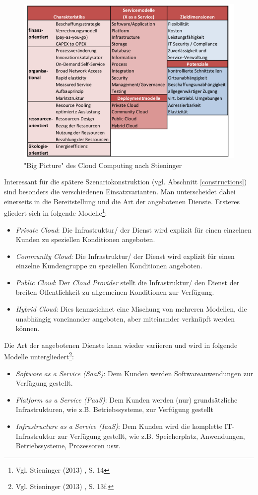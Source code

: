 \begin{figure}
	\centering
	\includegraphics[width=\linewidth]{images/bigpicture}
	\caption[Caption for parameters]{ "Big Picture" des Cloud Computing nach Stieninger \cite{stieninger}}
	\label{fig:bigpicture}
\end{figure}

Interessant für die spätere Szenariokonstruktion (vgl. Abschnitt \ref{constructions}) sind besonders die verschiedenen Einsatzvarianten. Man unterscheidet dabei einerseits in die Bereitstellung und die Art der angebotenen Dienste. Ersteres gliedert sich in folgende Modelle\footnote{Vgl. Stieninger (2013) \cite{stieninger}, S. 14}:
\begin{itemize}
	\item \textit{Private Cloud}: Die Infrastruktur/ der Dienst wird explizit für einen einzelnen Kunden zu speziellen Konditionen angeboten.
	\item \textit{Community Cloud}: Die Infrastruktur/ der Dienst wird explizit für einen einzelne Kundengruppe zu speziellen Konditionen angeboten.
	\item \textit{Public Cloud}: Der \textit{Cloud Provider} stellt die Infrastruktur/ den Dienst der breiten Öffentlichkeit zu allgemeinen Konditionen zur Verfügung.
	\item \textit{Hybrid Cloud}: Dies kennzeichnet eine Mischung von mehreren Modellen, die unabhängig voneinander angeboten, aber miteinander verknüpft werden können.
\end{itemize}

Die Art der angebotenen Dienste kann wieder variieren und wird in folgende Modelle untergliedert\footnote{Vgl. Stieninger (2013) \cite{stieninger}, S. 13f.}:
\begin{itemize}
	\item \textit{Software as a Service (SaaS)}: Dem Kunden werden Softwareanwendungen zur Verfügung gestellt.
	\item \textit{Platform as a Service (PaaS)}: Dem Kunden werden (nur) grundsätzliche Infrastrukturen, wie z.B. Betriebssysteme, zur Verfügung gestellt
	\item \textit{Infrastructure as a Service (IaaS)}: Dem Kunden wird die komplette IT-Infrastruktur zur Verfügung gestellt, wie z.B. Speicherplatz, Anwendungen, Betriebssysteme, Prozessoren usw.
\end{itemize}

